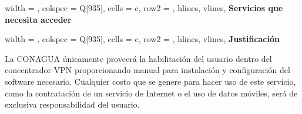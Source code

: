 \documentclass[letterpaper,9pt]{article}
\begin{document}
\begin{longtblr}[
	label = none,
	entry = none,
	]{
                    	width = \linewidth,
		colspec = {Q[935]},
		cells = {c},
		row{2} = {},
		hlines,
		vlines,
	}
	\textbf{Servicios que necesita acceder} \\\SERVICIOS  
\end{longtblr}

\begin{longtblr}[
	label = none,
	entry = none,
	]{
		width = \linewidth,
		colspec = {Q[935]},
		cells = {c},
		row{2} = {},
		hlines,
		vlines,
	}
	\textbf{Justificación} \\\JUSTIFICACION
\end{longtblr}
\clearpage

La CONAGUA únicamente proveerá la habilitación del usuario dentro del concentrador VPN  proporcionando manual  para instalación y configuración del software necesario. Cualquier costo que se genere para hacer uso de este servicio, como la contratación de un servicio de Internet  o el uso de datos móviles, será de exclusiva responsabilidad del usuario.
\end{document}
